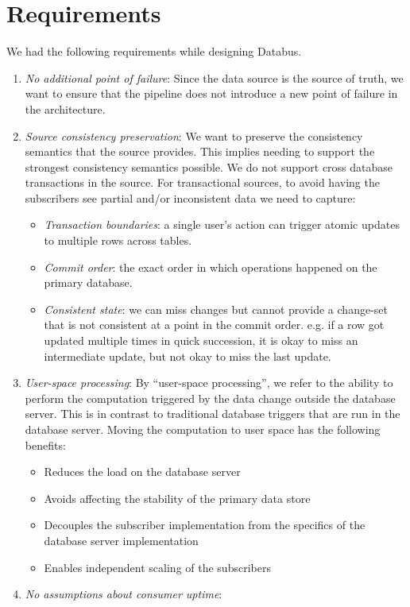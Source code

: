 \section{Requirements}
We had the following requirements while designing Databus.
\begin{enumerate}[I]
\item \emph{No additional point of failure}: 
Since the data source is the source of truth, we want to ensure that the pipeline does not introduce a new point of failure in the architecture. 
\item \emph{Source consistency preservation}: 
We want to preserve the consistency semantics that the source provides. 
This implies needing to support the strongest consistency semantics possible. 
We do not support cross database transactions in the source. 
For transactional sources, to avoid having the subscribers see partial and/or inconsistent data we need to capture:
\begin{itemize}
\item \emph{Transaction boundaries}: a single user's action can trigger atomic updates to multiple rows across tables. 
\item \emph{Commit order}: the exact order in which operations happened on the primary database.
\item \emph{Consistent state}: we can miss changes but cannot provide a change-set that is not consistent at a point in the commit order. e.g. if a row got updated multiple times in quick succession, it is okay to miss an intermediate update, but not okay to miss the last update. 
\end{itemize}
\item \emph{User-space processing}: 
By ``user-space processing'', we refer to the ability to perform the computation triggered by the data change outside the database server. This is in contrast to traditional database triggers that are run in the database server.
Moving the computation to user space has the following benefits:
\begin{itemize}
\item Reduces the load on the database server
\item Avoids affecting the stability of the primary data store
\item Decouples the subscriber implementation from the specifics of the database server implementation
\item Enables independent scaling of the subscribers
\end{itemize}
\item \emph{No assumptions about consumer uptime}: 

\end{enumerate}
